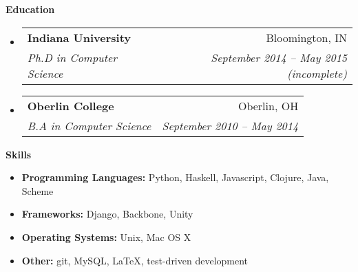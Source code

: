 \documentclass[letterpaper,11pt]{article}
\makeatletter
\newcommand{\resheading}[1]{{\large\colorbox{mygrey}{\begin{minipage}{\textwidth}{\textbf{#1\vphantom{p\^{E}}}}\end{minipage}}}}
\newcommand{\ressubheading}[4]{
  \begin{tabular*}{6.5in}{l@{\extracolsep{\fill}}r}
    \textbf{#1} & #2 \\
    \textit{#3} & \textit{#4} \\
  \end{tabular*}\vspace{-6pt}}
\makeatother
\begin{document}
\resheading{Education}
\begin{itemize}
\item
  \ressubheading{Indiana University}{Bloomington, IN}{Ph.D in Computer Science}{September 2014 -- May 2015 (incomplete)}
\item
  \ressubheading{Oberlin College}{Oberlin, OH}{B.A in Computer Science}{September 2010 -- May 2014}
\end{itemize}

\resheading{Skills}
\begin{itemize}
\item
  \textbf{Programming Languages:} Python, Haskell, Javascript, Clojure, Java, Scheme
\item
  \textbf{Frameworks:} Django, Backbone, Unity
\item
  \textbf{Operating Systems:} Unix, Mac OS X
\item
  \textbf{Other:} git, MySQL,  \LaTeX, test-driven development
\end{itemize}
\end{document}
